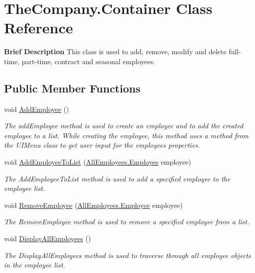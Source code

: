 \hypertarget{class_the_company_1_1_container}{}\section{The\+Company.\+Container Class Reference}
\label{class_the_company_1_1_container}


{\bfseries Brief Description} This class is used to add, remove, modify and delete full-\/time, part-\/time, contract and seasonal employees.  


\subsection*{Public Member Functions}
\begin{DoxyCompactItemize}
\item 
void \hyperlink{class_the_company_1_1_container_a5f7b06d8c706d98dd89d337c00c29d97}{Add\+Employee} ()
\begin{DoxyCompactList}\small\item\em The add\+Employee method is used to create an employee and to add the created employee to a list. While creating the employee, this method uses a method from the U\+I\+Menu class to get user input for the employee\textquotesingle{}s properties. \end{DoxyCompactList}\item 
void \hyperlink{class_the_company_1_1_container_a02df30318efe4c62e6c815f06719d886}{Add\+Employee\+To\+List} (\hyperlink{class_all_employees_1_1_employee}{All\+Employees.\+Employee} employee)
\begin{DoxyCompactList}\small\item\em The Add\+Employee\+To\+List method is used to add a specified employee to the employee list. \end{DoxyCompactList}\item 
void \hyperlink{class_the_company_1_1_container_a83e3bd47b7d2b1a89fc87e70f8fb9082}{Remove\+Employee} (\hyperlink{class_all_employees_1_1_employee}{All\+Employees.\+Employee} employee)
\begin{DoxyCompactList}\small\item\em The Remove\+Employee method is used to remove a specified employee from a list. \end{DoxyCompactList}\item 
void \hyperlink{class_the_company_1_1_container_a4ae3d96ffff3765f4b1f01314fbb4f45}{Display\+All\+Employees} ()
\begin{DoxyCompactList}\small\item\em The Display\+All\+Employees method is used to traverse through all employee objects in the employee list. \end{DoxyCompactList}\item 

\end{DoxyCompactItemize}
